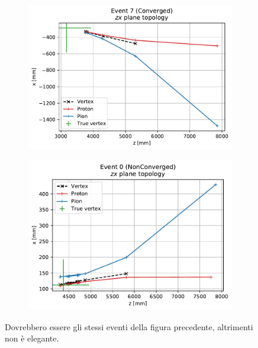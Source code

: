 \begin{figure}[t]
	\centering
	\begin{subfigure}{.45\textwidth}
		\includegraphics[width=\textwidth]{graphics/03-vertex_reconstruction/evt_converged_zx_iter.pdf}
		\caption{}
		\label{fig:zx_iter_conv}
	\end{subfigure}
	\begin{subfigure}{.45\textwidth}
		\includegraphics[width=\textwidth]{graphics/03-vertex_reconstruction/evt_failed_zx_iter.pdf}
		\caption{}
		\label{fig:zx_iter_failed}
	\end{subfigure}
	\caption[A and b.]{Dovrebbero essere gli stessi eventi della figura precedente, altrimenti non è elegante.}
	\label{fig:zx_iter_conv_vs_failed}
\end{figure}

